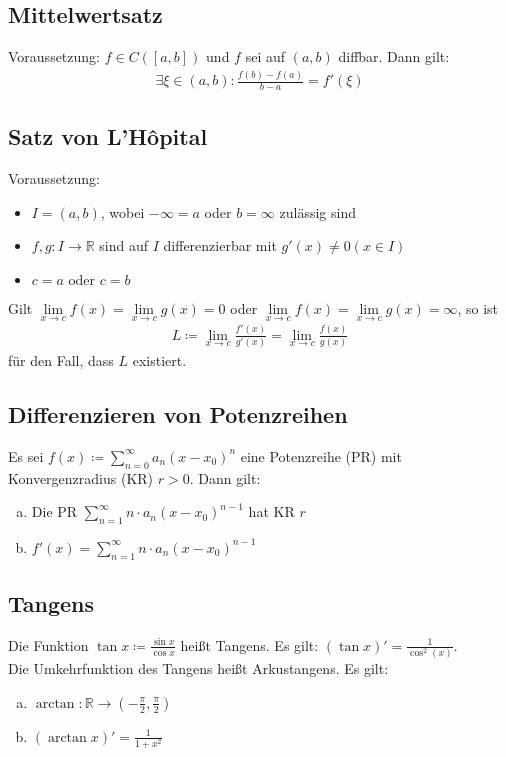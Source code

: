 \subsection{Mittelwertsatz}
Voraussetzung: $f \in C([a,b])$ und $f$ sei auf $(a,b)$ diffbar. Dann gilt: 
\begin{align*}
    \exists \xi \in (a,b): \frac{f(b) - f(a)}{b-a} = f'(\xi)
\end{align*}

\subsection{Satz von L'Hôpital}
Voraussetzung:
\begin{itemize}
    \item $I=(a,b)$, wobei $-\infty=a$ oder $b=\infty$ zulässig sind
    \item $f,g: I \to \mathbb{R}$ sind auf $I$ differenzierbar mit $g'(x) \neq 0 (x \in I)$
    \item $c=a \text{ oder } c=b$
\end{itemize}
Gilt $\lim \limits_{x \to c} f(x) = \lim \limits_{x \to c} g(x) = 0$ oder $\lim \limits_{x \to c} f(x) = \lim \limits_{x \to c} g(x) = \infty$, so ist 
\begin{align*}
    L \coloneqq \lim \limits_{x \to c} \frac{f'(x)}{g'(x)} =  \lim \limits_{x \to c} \frac{f(x)}{g(x)}
\end{align*}
für den Fall, dass $L$ existiert.

\subsection{Differenzieren von Potenzreihen}
Es sei $ f(x) \coloneqq \sum \limits_{n=0}^{\infty} a_n(x-x_0)^n$ eine Potenzreihe (PR) mit Konvergenzradius (KR) $r>0$. Dann gilt: \\
\begin{enumerate}[a)]
    \item Die PR $\sum \limits_{n=1}^{\infty} n \cdot a_n(x-x_0)^{n-1}$ hat KR $r$
    \item $f'(x) = \sum \limits_{n=1}^{\infty} n \cdot a_n(x-x_0)^{n-1}$
\end{enumerate}

\subsection{Tangens}
Die Funktion $\tan x \coloneqq \frac{\sin x}{\cos x}$ heißt Tangens. Es gilt: $(\tan x)' = \frac{1}{\cos^2(x)}$. \\
Die Umkehrfunktion des Tangens heißt Arkustangens. Es gilt: 
\begin{enumerate}[a)]
    \item $\arctan: \mathbb{R} \to (-\frac{\pi}{2},\frac{\pi}{2})$
    \item $(\arctan x)' = \frac{1}{1+x^2}$
\end{enumerate}

